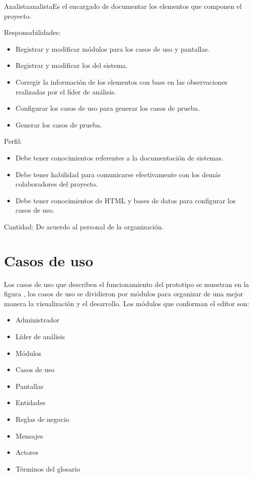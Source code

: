 \begin{actor}{Analista}{analista}{Es el encargado de documentar los elementos que componen el proyecto.}
    \item[Responsabilidades:] \hspace{1pt}
    \begin{itemize}
	\item Registrar y modificar módulos para los casos de uso y pantallas.
	\item Registrar y modificar los  del sistema.
	\item Corregir la información de los elementos con base en las observaciones realizadas por el líder de análisis.
	\item Configurar los casos de uso para generar los casos de prueba.
	\item Generar los casos de prueba.
    \end{itemize}
    \item[Perfil:] \hspace{1pt}
    \begin{itemize}
	\item Debe tener conocimientos referentes a la documentación de sistemas.
	\item Debe tener habilidad para comunicarse efectivamente con los demás colaboradores del proyecto.
	\item Debe tener conocimientos de HTML y bases de datos para configurar los casos de uso.
    \end{itemize}
    \item[Cantidad:] De acuerdo al personal de la organización.
\end{actor}


\clearpage
\section{Casos de uso}
Los casos de uso que describen el funcionamiento del prototipo se muestran en la figura , 
los casos de uso se dividieron por módulos para organizar de una mejor manera la visualización y el desarrollo. Los módulos
que conforman el editor son:
\begin{itemize}
	\item Administrador
	\item Líder de análisis
	\item Módulos
	\item Casos de uso
	\item Pantallas
	\item Entidades
	\item Reglas de negocio
	\item Mensajes
	\item Actores
	\item Términos del glosario
\end{itemize}

